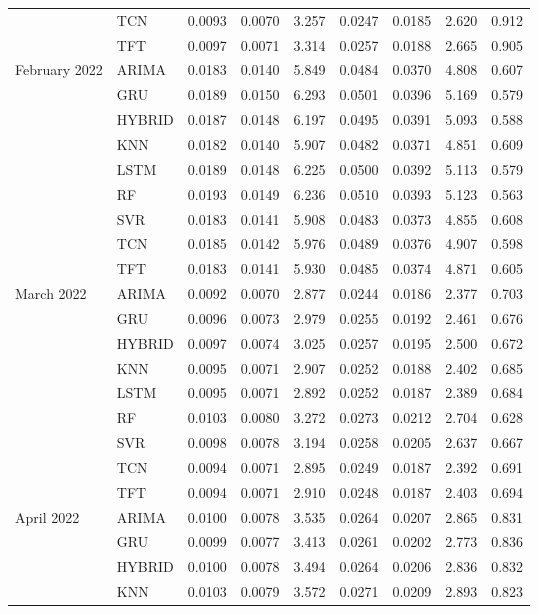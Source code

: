 \begin{tabular}{lllllllll}
 & TCN & 0.0093 & 0.0070 & 3.257 & 0.0247 & 0.0185 & 2.620 & 0.912 \\
 & TFT & 0.0097 & 0.0071 & 3.314 & 0.0257 & 0.0188 & 2.665 & 0.905 \\
February 2022 & ARIMA & 0.0183 & 0.0140 & 5.849 & 0.0484 & 0.0370 & 4.808 & 0.607 \\
 & GRU & 0.0189 & 0.0150 & 6.293 & 0.0501 & 0.0396 & 5.169 & 0.579 \\
 & HYBRID & 0.0187 & 0.0148 & 6.197 & 0.0495 & 0.0391 & 5.093 & 0.588 \\
 & KNN & 0.0182 & 0.0140 & 5.907 & 0.0482 & 0.0371 & 4.851 & 0.609 \\
 & LSTM & 0.0189 & 0.0148 & 6.225 & 0.0500 & 0.0392 & 5.113 & 0.579 \\
 & RF & 0.0193 & 0.0149 & 6.236 & 0.0510 & 0.0393 & 5.123 & 0.563 \\
 & SVR & 0.0183 & 0.0141 & 5.908 & 0.0483 & 0.0373 & 4.855 & 0.608 \\
 & TCN & 0.0185 & 0.0142 & 5.976 & 0.0489 & 0.0376 & 4.907 & 0.598 \\
 & TFT & 0.0183 & 0.0141 & 5.930 & 0.0485 & 0.0374 & 4.871 & 0.605 \\
March 2022 & ARIMA & 0.0092 & 0.0070 & 2.877 & 0.0244 & 0.0186 & 2.377 & 0.703 \\
 & GRU & 0.0096 & 0.0073 & 2.979 & 0.0255 & 0.0192 & 2.461 & 0.676 \\
 & HYBRID & 0.0097 & 0.0074 & 3.025 & 0.0257 & 0.0195 & 2.500 & 0.672 \\
 & KNN & 0.0095 & 0.0071 & 2.907 & 0.0252 & 0.0188 & 2.402 & 0.685 \\
 & LSTM & 0.0095 & 0.0071 & 2.892 & 0.0252 & 0.0187 & 2.389 & 0.684 \\
 & RF & 0.0103 & 0.0080 & 3.272 & 0.0273 & 0.0212 & 2.704 & 0.628 \\
 & SVR & 0.0098 & 0.0078 & 3.194 & 0.0258 & 0.0205 & 2.637 & 0.667 \\
 & TCN & 0.0094 & 0.0071 & 2.895 & 0.0249 & 0.0187 & 2.392 & 0.691 \\
 & TFT & 0.0094 & 0.0071 & 2.910 & 0.0248 & 0.0187 & 2.403 & 0.694 \\
April 2022 & ARIMA & 0.0100 & 0.0078 & 3.535 & 0.0264 & 0.0207 & 2.865 & 0.831 \\
 & GRU & 0.0099 & 0.0077 & 3.413 & 0.0261 & 0.0202 & 2.773 & 0.836 \\
 & HYBRID & 0.0100 & 0.0078 & 3.494 & 0.0264 & 0.0206 & 2.836 & 0.832 \\
 & KNN & 0.0103 & 0.0079 & 3.572 & 0.0271 & 0.0209 & 2.893 & 0.823 \\

\end{tabular}
